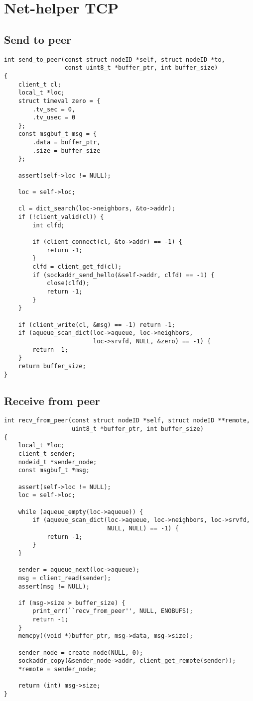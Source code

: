 \section{Net-helper TCP}

\subsection{Send to peer}
\label{nh-send2peer}
\begin{lstlisting}
int send_to_peer(const struct nodeID *self, struct nodeID *to,
                 const uint8_t *buffer_ptr, int buffer_size)
{
    client_t cl;
    local_t *loc;
    struct timeval zero = {
        .tv_sec = 0,
        .tv_usec = 0
    };
    const msgbuf_t msg = {
        .data = buffer_ptr,
        .size = buffer_size
    };

    assert(self->loc != NULL);

    loc = self->loc;

    cl = dict_search(loc->neighbors, &to->addr);
    if (!client_valid(cl)) {
        int clfd;

        if (client_connect(cl, &to->addr) == -1) {
            return -1;
        }
        clfd = client_get_fd(cl);
        if (sockaddr_send_hello(&self->addr, clfd) == -1) {
            close(clfd);
            return -1;
        }
    }

    if (client_write(cl, &msg) == -1) return -1;
    if (aqueue_scan_dict(loc->aqueue, loc->neighbors,
                         loc->srvfd, NULL, &zero) == -1) {
        return -1;
    }
    return buffer_size;
}
\end{lstlisting}

\subsection{Receive from peer}
\label{nh-rcv-peer}
\begin{lstlisting}
int recv_from_peer(const struct nodeID *self, struct nodeID **remote,
                   uint8_t *buffer_ptr, int buffer_size)
{
    local_t *loc;
    client_t sender;
    nodeid_t *sender_node;
    const msgbuf_t *msg;

    assert(self->loc != NULL);
    loc = self->loc;

    while (aqueue_empty(loc->aqueue)) {
        if (aqueue_scan_dict(loc->aqueue, loc->neighbors, loc->srvfd,
                             NULL, NULL) == -1) {
            return -1;
        }
    }

    sender = aqueue_next(loc->aqueue);
    msg = client_read(sender);
    assert(msg != NULL);

    if (msg->size > buffer_size) {
        print_err(``recv_from_peer'', NULL, ENOBUFS);
        return -1;
    }
    memcpy((void *)buffer_ptr, msg->data, msg->size);

    sender_node = create_node(NULL, 0);
    sockaddr_copy(&sender_node->addr, client_get_remote(sender));
    *remote = sender_node;

    return (int) msg->size;
}
\end{lstlisting}

